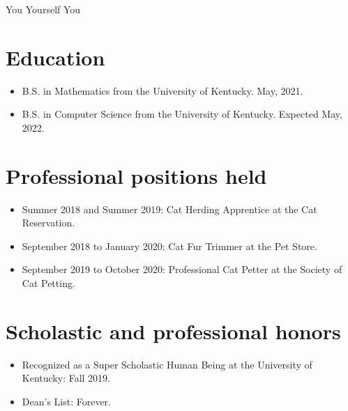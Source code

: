 \documentclass{uk_thesis}
\begin{document}
    \begin{center}You Yourself You\end{center}

    \section*{Education}

      \begin{itemize}
        \item B.S. in Mathematics from the University of Kentucky. May, 2021.
        \item B.S. in Computer Science from the University of Kentucky. Expected May, 2022.
      \end{itemize}


    \section*{Professional positions held}

        \begin{itemize}
            \item Summer 2018 and Summer 2019: Cat Herding Apprentice at the Cat Reservation.
            \item September 2018 to January 2020: Cat Fur Trimmer at the Pet Store.
            \item September 2019 to October 2020: Professional Cat Petter at the Society of Cat Petting.
        \end{itemize}

    \section*{Scholastic and professional honors}

        \begin{itemize}
            \item Recognized as a Super Scholastic Human Being at the University of Kentucky: Fall 2019.
            \item Dean's List: Forever.
        \end{itemize}
\end{document}
